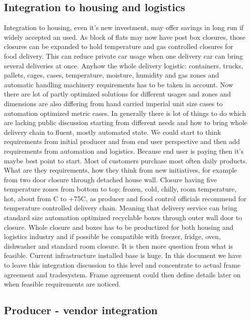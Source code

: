\subsection{Integration to housing and logistics}
\label{integration}
Integration to housing, even it's new investment, may offer savings in long
run if widely accepted an used. As block of flats may now have post box
closures, those closures can be expanded to hold temperature and gas
controlled closures for food delivery. This can reduce private car usage when
one delivery car can bring several deliveries at once. Anyhow the whole
delivery logistic: containers, trucks, pallets, cages, cases, temperature,
moisture, humidity and gas  zones and automatic handling machinery
requirements has to be taken in account. Now there are lot of partly optimized
solutions for different usages and zones and dimensions are also differing
from hand carried imperial unit size cases to automation optimized metric
cases. In generally there is lot of things to do which are lacking public
discussion starting from different needs and how to bring whole delivery chain
to fluent, mostly automated state. We could start to think requirements from
initial producer and from end user perspective and then add requirements from
automation and logistics. Because end user is paying then it's maybe best
point to start. Most of customers purchase most often daily products. What are
they requirements, how they think  from new initiatives, for example from two
door closure through detached house wall. Closure having five temperature
zones from bottom to top; frozen, cold, chilly, room temperature, hot, about
from \textdegree C to +75\textdegree C, as producer and food
control officials recommend for temperature controlled delivery chain.
Meaning that delivery service can bring standard size automation optimized
recyclable boxes through outer wall door to closure. Whole closure and boxes
has to be productized for both housing and logistics industry and if possible
be compatible with freezer, fridge, oven, dishwasher and standard room
closure. It is then more question from what is feasible. Current
infrastructure installed base is huge. In this document we have to leave this
integration discussion to this level and concentrate to actual frame
agreement and tradesystem. Frame agreement could then define details later on
when feasible requirements are noticed. 

\subsection{Producer - vendor integration}
\label{producer}

